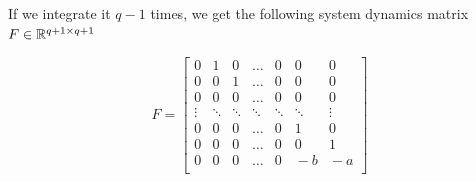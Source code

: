{If we integrate it $q-1$ times, we get the following system dynamics matrix $F\in\mathbb{R}^{q+1\times q+1}$

$$F = \begin{bmatrix}
    0 & 1 & 0 & \!\!\dots\!\! & 0 & 0 & 0 \\
    0 & 0 & 1 & \!\!\dots\!\! & 0 & 0 & 0 \\
    0 & 0 & 0 & \!\!\dots\!\! & 0 & 0 & 0 \\
    \vdots & \!\!\ddots\!\! & \!\!\ddots\!\! & \!\!\ddots\!\! & \!\!\ddots\!\! & \!\!\ddots\!\! & \vdots \\
    0 & 0 & 0 & \!\!\dots\!\! & 0 & 1 & 0 \\
    0 & 0 & 0 & \!\!\dots\!\! & 0 & 0 & 1 \\
    0 & 0 & 0 & \!\!\dots\!\! & 0 & \!\!-b & \!\!\!\!-a \\
\end{bmatrix}$$

}
